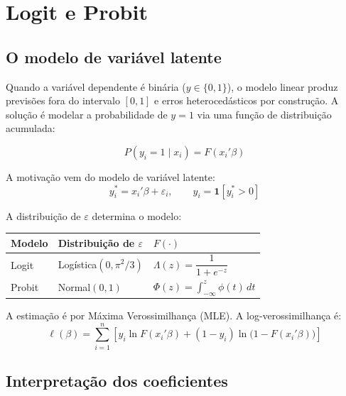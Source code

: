 \chapter{Logit e Probit}
\label{cap:logit}

\section{O modelo de variável latente}

Quando a variável dependente é binária ($y \in \{0,1\}$), o modelo linear
produz previsões fora do intervalo $[0,1]$ e erros heterocedásticos por
construção. A solução é modelar a probabilidade de $y=1$ via uma função
de distribuição acumulada:

\[
  P(y_i = 1 \mid x_i) = F(x_i'\beta)
\]

A motivação vem do modelo de variável latente:
\[
  y_i^* = x_i'\beta + \varepsilon_i, \qquad y_i = \mathbf{1}[y_i^* > 0]
\]

A distribuição de $\varepsilon$ determina o modelo:

\begin{center}
\begin{tabular}{lll}
\toprule
\textbf{Modelo} & \textbf{Distribuição de $\varepsilon$} & \textbf{$F(\cdot)$} \\
\midrule
Logit  & Logística$(0, \pi^2/3)$ & $\Lambda(z) = \dfrac{1}{1 + e^{-z}}$ \\[8pt]
Probit & Normal$(0, 1)$           & $\Phi(z) = \displaystyle\int_{-\infty}^{z} \phi(t)\,dt$ \\
\bottomrule
\end{tabular}
\end{center}

A estimação é por Máxima Verossimilhança (MLE). A log-verossimilhança é:
\[
  \ell(\beta) = \sum_{i=1}^{n}
    \left[y_i \ln F(x_i'\beta) + (1-y_i)\ln\bigl(1 - F(x_i'\beta)\bigr)\right]
\]

\section{Interpretação dos coeficientes}

